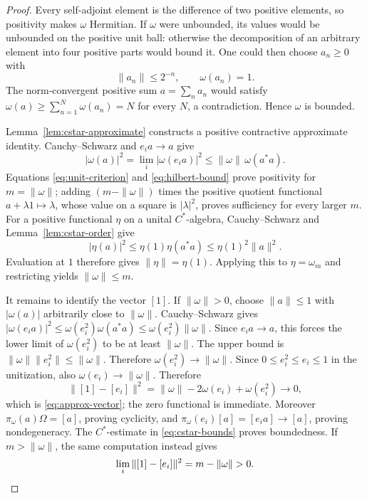 \documentclass[11pt]{article}
\numberwithin{equation}{section}
\begin{document}
\begin{proof}
Every self-adjoint element is the difference of two positive elements,
so positivity makes $\omega$ Hermitian.  If $\omega$ were unbounded, its
values would be unbounded on the positive unit ball: otherwise the
decomposition of an arbitrary element into four positive parts would
bound it.  One could then choose $a_n\geq0$ with
\[
 \|a_n\|\leq2^{-n},\qquad \omega(a_n)=1.
\]
The norm-convergent positive sum $a=\sum_na_n$ would satisfy
$\omega(a)\geq\sum_{n=1}^N\omega(a_n)=N$ for every $N$, a
contradiction.  Hence $\omega$ is bounded.

Lemma~\ref{lem:cstar-approximate} constructs a positive contractive
approximate identity.  Cauchy--Schwarz and
$e_i a\to a$ give
\begin{equation}
 |\omega(a)|^2
 =\lim_i|\omega(e_i a)|^2
 \leq\|\omega\|\,\omega(a^*a).
 \label{eq:hilbert-bound}
\end{equation}
Equations \eqref{eq:unit-criterion} and \eqref{eq:hilbert-bound} prove
positivity for $m=\|\omega\|$; adding $(m-\|\omega\|)$ times the
positive quotient functional $a+\lambda1\mapsto\lambda$, whose value
on a square is $|\lambda|^2$, proves
sufficiency for every larger $m$.  For a positive functional $\eta$ on a
unital $C^*$-algebra, Cauchy--Schwarz and Lemma~\ref{lem:cstar-order} give
\[
 |\eta(a)|^2\leq\eta(1)\eta(a^*a)
             \leq\eta(1)^2\|a\|^2.
\]
Evaluation at $1$ therefore gives $\|\eta\|=\eta(1)$.
Applying this to $\eta=\omega_m$ and restricting yields $\|\omega\|\leq m$.

It remains to identify the vector $[1]$.  If $\|\omega\|>0$, choose
$\|a\|\leq1$ with $|\omega(a)|$ arbitrarily close to $\|\omega\|$.
Cauchy--Schwarz gives
$|\omega(e_i a)|^2\leq\omega(e_i^2)\omega(a^*a)
\leq\omega(e_i^2)\|\omega\|$.
Since $e_i a\to a$, this forces the lower limit of $\omega(e_i^2)$ to be
at least $\|\omega\|$.  The upper bound is $\|\omega\|\|e_i^2\|\leq\|\omega\|$.
Therefore $\omega(e_i^2)\to\|\omega\|$.
Since $0\leq e_i^2\leq e_i\leq1$ in the unitization, also
$\omega(e_i)\to\|\omega\|$.  Therefore
\[
 \|[1]-[e_i]\|^2
 =\|\omega\|-2\omega(e_i)+\omega(e_i^2)\longrightarrow0,
\]
which is \eqref{eq:approx-vector}; the zero functional is immediate.
Moreover $\pi_\omega(a)\Omega=[a]$, proving cyclicity, and
$\pi_\omega(e_i)[a]=[e_i a]\to[a]$, proving nondegeneracy.  The
$C^*$-estimate in \eqref{eq:cstar-bounds} proves boundedness.  If
$m>\|\omega\|$, the same computation instead gives
\[
 \lim_i\|[1]-[e_i]\|^2=m-\|\omega\|>0.\qedhere
\]
\end{proof}
\end{document}
